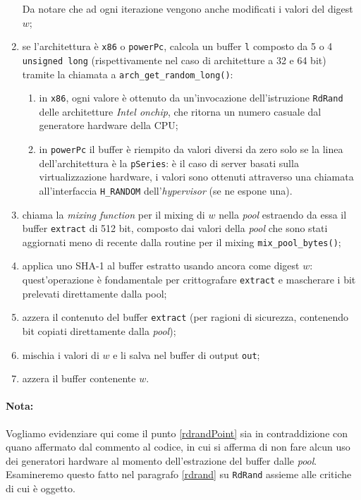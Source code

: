 \documentclass{article}
\begin{document}
\begin{enumerate}
   
   Da notare che ad ogni iterazione
   vengono anche modificati i valori del digest $w$; 
   \item se l'architettura è \verb+x86+ o \verb+powerPc+, calcola un buffer
   \verb+l+ composto da 5 o 4 \verb+unsigned long+ (rispettivamente nel caso di
   architetture a 32 e 64 bit) tramite la chiamata a
   \verb+arch_get_random_long()+:
   \begin{enumerate}
     \item in \verb+x86+, ogni valore è ottenuto da un'invocazione
     dell'istruzione \verb+RdRand+ delle architetture \emph{Intel onchip}, che
     ritorna un numero casuale dal generatore hardware della
     CPU;\label{rdrandPoint}
     \item in \verb+powerPc+ il buffer è riempito da valori diversi da zero 
     solo se la linea dell'architettura è la \verb+pSeries+: è il
     caso di server basati sulla virtualizzazione hardware, i valori sono
     ottenuti attraverso una chiamata all'interfaccia \verb+H_RANDOM+
     dell'\emph{hypervisor} (se ne espone una).
   \end{enumerate} 
   \item chiama la \emph{mixing function} per il mixing di $w$ nella
   \emph{pool} estraendo da essa il buffer \verb+extract+ di 512 bit, composto
   dai valori della \emph{pool} che sono stati aggiornati meno di recente dalla
   routine per il mixing \verb+mix_pool_bytes()+;
   \item applica uno SHA-1 al buffer estratto usando ancora come digest $w$:
   quest'operazione è fondamentale per crittografare \verb+extract+ e mascherare i
   bit prelevati direttamente dalla pool;
   \item azzera il contenuto del buffer \verb+extract+ (per ragioni di sicurezza,
   contenendo bit copiati direttamente dalla \emph{pool});
   \item mischia i valori di $w$ e li salva nel buffer di output \verb+out+;
   \item azzera il buffer contenente $w$.
 \end{enumerate}
 
 \paragraph{Nota:}Vogliamo evidenziare qui come il punto \ref{rdrandPoint} sia
 in contraddizione con quano affermato dal commento al codice, in cui si afferma
 di non fare alcun uso dei generatori hardware al momento dell'estrazione del
 buffer dalle \emph{pool}. Esamineremo questo fatto nel paragrafo \ref{rdrand}
 su \verb+RdRand+ assieme alle critiche di cui è oggetto.
 
\end{document}
